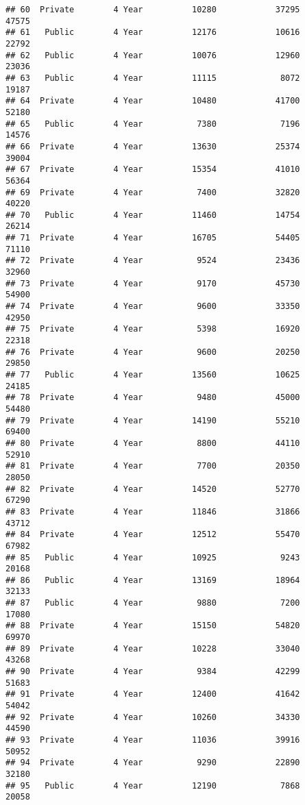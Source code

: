 \documentclass[
]{article}
\begin{document}
\begin{verbatim}
## 60  Private        4 Year          10280            37295          47575
## 61   Public        4 Year          12176            10616          22792
## 62   Public        4 Year          10076            12960          23036
## 63   Public        4 Year          11115             8072          19187
## 64  Private        4 Year          10480            41700          52180
## 65   Public        4 Year           7380             7196          14576
## 66  Private        4 Year          13630            25374          39004
## 67  Private        4 Year          15354            41010          56364
## 69  Private        4 Year           7400            32820          40220
## 70   Public        4 Year          11460            14754          26214
## 71  Private        4 Year          16705            54405          71110
## 72  Private        4 Year           9524            23436          32960
## 73  Private        4 Year           9170            45730          54900
## 74  Private        4 Year           9600            33350          42950
## 75  Private        4 Year           5398            16920          22318
## 76  Private        4 Year           9600            20250          29850
## 77   Public        4 Year          13560            10625          24185
## 78  Private        4 Year           9480            45000          54480
## 79  Private        4 Year          14190            55210          69400
## 80  Private        4 Year           8800            44110          52910
## 81  Private        4 Year           7700            20350          28050
## 82  Private        4 Year          14520            52770          67290
## 83  Private        4 Year          11846            31866          43712
## 84  Private        4 Year          12512            55470          67982
## 85   Public        4 Year          10925             9243          20168
## 86   Public        4 Year          13169            18964          32133
## 87   Public        4 Year           9880             7200          17080
## 88  Private        4 Year          15150            54820          69970
## 89  Private        4 Year          10228            33040          43268
## 90  Private        4 Year           9384            42299          51683
## 91  Private        4 Year          12400            41642          54042
## 92  Private        4 Year          10260            34330          44590
## 93  Private        4 Year          11036            39916          50952
## 94  Private        4 Year           9290            22890          32180
## 95   Public        4 Year          12190             7868          20058

\end{verbatim}
\end{document}
